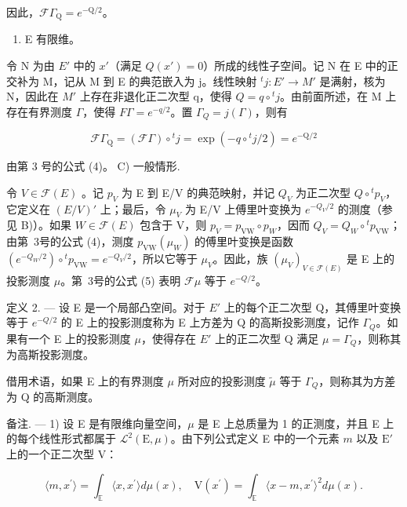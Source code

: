 因此，\(\mathcal{F}\Gamma_{\mathrm{Q}} = e^{-\mathrm{Q} / 2}\)。

\begin{enumerate}
\def\labelenumi{\Alph{enumi})}
\setcounter{enumi}{1}
\tightlist
\item
  E 有限维。
\end{enumerate}

令 N 为由 \(E'\) 中的 \(x'\)（满足 \(Q(x') = 0\)）所成的线性子空间。记 N 在 E 中的正交补为 M，记从 M 到 E 的典范嵌入为 j。线性映射 \({}^{t}j : E' \to M'\) 是满射，核为 N，因此在 \(M'\) 上存在非退化正二次型 q，使得 \(Q = q \circ {}^{t}j\)。由前面所述，在 M 上存在有界测度 \(\Gamma\)，使得 \(F\Gamma = e^{-q/2}\)。置 \(\Gamma_{Q} = j(\Gamma)\)，则有

\[
\mathcal {F} \Gamma_ {\mathrm{Q}} = (\mathcal {F} \Gamma) \circ {} ^ {t} j = \exp (- q \circ {} ^ {t} j / 2) = e ^ {- \mathrm{Q} / 2}
\]

由第 3 号的公式 (4)。
\relax{}
C) 一般情形.

令 \(V \in \mathcal{F}(E)\) 。记 \(p_V\) 为 E 到 E/V 的典范映射，并记 \(Q_V\) 为正二次型 \(Q \circ {}^t p_V\)，它定义在 \((E/V)'\) 上；最后，令 \(\mu_V\) 为 E/V 上傅里叶变换为 \(e^{-Q_V/2}\) 的测度（参见 B)）。如果 \(W \in \mathcal{F}(E)\) 包含于 V，则 \(p_V = p_{\text{VW}} \circ p_W\)，因而 \(Q_V = Q_W \circ {}^t p_{\text{VW}}\)；由第~3号的公式 (4)，测度 \(p_{\text{VW}}(\mu_W)\) 的傅里叶变换是函数 \((e^{-Q_W/2}) \circ {}^t p_{\text{VW}} = e^{-Q_V/2}\)，所以它等于 \(\mu_V\)。因此，族 \((\mu_V)_{V \in \mathcal{F}(E)}\) 是 E 上的投影测度 \(\mu\)。第~3号的公式 (5) 表明 \(\mathcal{F}\mu\) 等于 \(e^{-Q/2}\)。

定义 2. --- 设 E 是一个局部凸空间。对于 \(E'\) 上的每个正二次型 Q，其傅里叶变换等于 \(e^{-Q/2}\) 的 E 上的投影测度称为 E 上方差为 Q 的高斯投影测度，记作 \(\Gamma_{Q}\)。如果有一个 E 上的投影测度 \(\mu\)，使得存在 \(E'\) 上的正二次型 Q 满足 \(\mu = \Gamma_{Q}\)，则称其为高斯投影测度。

借用术语，如果 E 上的有界测度 \(\mu\) 所对应的投影测度 \(\widetilde{\mu}\) 等于 \(\Gamma_{Q}\)，则称其为方差为 Q 的高斯测度。

备注. --- 1) 设 E 是有限维向量空间，\(\mu\) 是 E 上总质量为 1 的正测度，并且 E 上的每个线性形式都属于 \(\mathcal{L}^{2}(\mathrm{E},\mu)\)。由下列公式定义 E 中的一个元素 \(m\) 以及 \(\mathrm{E}'\) 上的一个正二次型 V：

\[
\langle m, x ^ {\prime} \rangle = \int_ {\mathbb {E}} \langle x, x ^ {\prime} \rangle d \mu (x), \quad \mathrm{V} (x ^ {\prime}) = \int_ {\mathbb {E}} \langle x - m, x ^ {\prime} \rangle^ {2} d \mu (x).
\]

